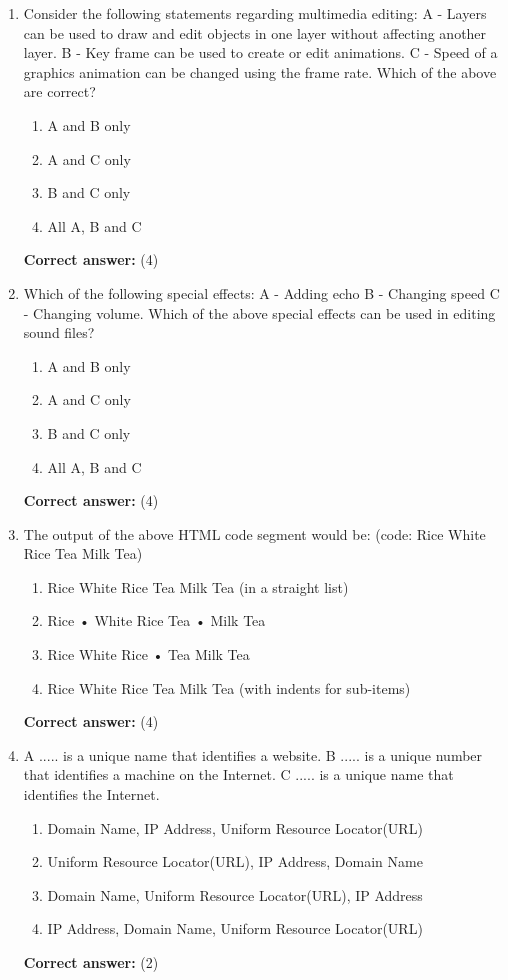\documentclass[12pt]{article}
\begin{document}
\begin{enumerate}[label=Q\arabic*:,leftmargin=*,resume]
\item Consider the following statements regarding multimedia editing: A - Layers can be used to draw and edit objects in one layer without affecting another layer. B - Key frame can be used to create or edit animations. C - Speed of a graphics animation can be changed using the frame rate. Which of the above are correct?\\
\begin{enumerate}[label=(\arabic*)]
\item A and B only
\item A and C only
\item B and C only
\item All A, B and C
\end{enumerate}
\textbf{Correct answer:} (4)

\item Which of the following special effects: A - Adding echo B - Changing speed C - Changing volume. Which of the above special effects can be used in editing sound files?\\
\begin{enumerate}[label=(\arabic*)]
\item A and B only
\item A and C only
\item B and C only
\item All A, B and C
\end{enumerate}
\textbf{Correct answer:} (4)

\item The output of the above HTML code segment would be: (code: Rice White Rice Tea Milk Tea)\\
\begin{enumerate}[label=(\arabic*)]
\item Rice White Rice Tea Milk Tea (in a straight list)
\item Rice • White Rice Tea • Milk Tea
\item Rice White Rice • Tea Milk Tea
\item Rice White Rice Tea Milk Tea (with indents for sub-items)
\end{enumerate}
\textbf{Correct answer:} (4)

\item A ..... is a unique name that identifies a website. B ..... is a unique number that identifies a machine on the Internet. C ..... is a unique name that identifies the Internet.\\
\begin{enumerate}[label=(\arabic*)]
\item Domain Name, IP Address, Uniform Resource Locator(URL)
\item Uniform Resource Locator(URL), IP Address, Domain Name
\item Domain Name, Uniform Resource Locator(URL), IP Address
\item IP Address, Domain Name, Uniform Resource Locator(URL)
\end{enumerate}
\textbf{Correct answer:} (2)


\end{enumerate}
\end{document}
